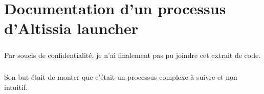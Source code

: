 \chapter{Documentation d'un processus d'Altissia launcher}
\label{ch:altissia-launcher-doc}

\paragraph{}
Par soucis de confidentialité, je n'ai finalement pas pu joindre cet extrait de code.

\paragraph{}
Son but était de monter que c'était un processus complexe à suivre et non intuitif.